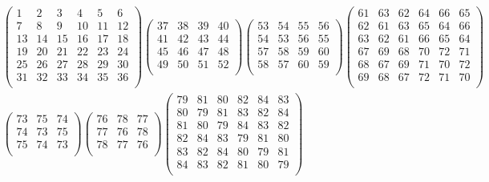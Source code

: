 \documentclass[12pt,a4paper,landscape]{amsart}
\begin{document}
\begin{align*}
\left(\begin{array}{r|r|r|r|r|r}%
1&2&3&4&5&6\\\hline%
7&8&9&10&11&12\\\hline%
13&14&15&16&17&18\\\hline%
19&20&21&22&23&24\\\hline%
25&26&27&28&29&30\\\hline%
31&32&33&34&35&36\\%
\end{array}\right)%
\left(\begin{array}{r|r|r|r}%
37&38&39&40\\\hline%
41&42&43&44\\\hline%
45&46&47&48\\\hline%
49&50&51&52\\%
\end{array}\right)%
\left(\begin{array}{rr|rr}%
53&54&55&56\\%
54&53&56&55\\\hline%
57&58&59&60\\%
58&57&60&59\\%
\end{array}\right)%
\left(\begin{array}{rrr|rrr}%
61&63&62&64&66&65\\%
62&61&63&65&64&66\\%
63&62&61&66&65&64\\\hline%
67&69&68&70&72&71\\%
68&67&69&71&70&72\\%
69&68&67&72&71&70\\%
\end{array}\right)%
\\
\left(\begin{array}{rrr}%
73&75&74\\%
74&73&75\\%
75&74&73\\%
\end{array}\right)%
\left(\begin{array}{rrr}%
76&78&77\\%
77&76&78\\%
78&77&76\\%
\end{array}\right)%
\left(\begin{array}{rrrrrr}%
79&81&80&82&84&83\\%
80&79&81&83&82&84\\%
81&80&79&84&83&82\\%
82&84&83&79&81&80\\%
83&82&84&80&79&81\\%
84&83&82&81&80&79\\%
\end{array}\right)%
\end{align*}
\end{document}
